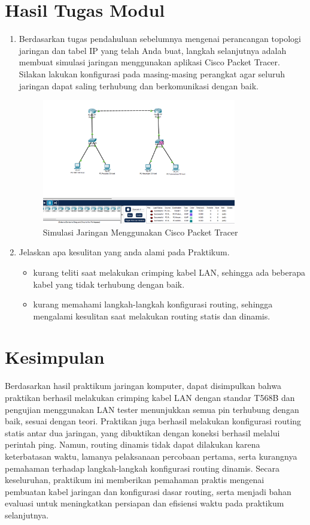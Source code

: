 \section{Hasil Tugas Modul}
\begin{enumerate}
    \item Berdasarkan tugas pendahuluan sebelumnya mengenai perancangan topologi jaringan dan tabel IP yang telah Anda buat, langkah selanjutnya adalah membuat simulasi jaringan menggunakan aplikasi Cisco Packet Tracer. Silakan lakukan konfigurasi pada masing-masing perangkat agar seluruh jaringan dapat saling terhubung dan berkomunikasi dengan baik.
    \begin{figure}
        \centering
        \includegraphics[width=0.8\textwidth]{P1/img/image.png}
        \caption{Simulasi Jaringan Menggunakan Cisco Packet Tracer}
        \label{fig:simulasi_jaringan}
    \end{figure}

    \item Jelaskan apa kesulitan yang anda alami pada Praktikum.
    \begin{itemize}
        \item kurang teliti saat melakukan crimping kabel LAN, sehingga ada beberapa kabel yang tidak terhubung dengan baik.
        \item kurang memahami langkah-langkah konfigurasi routing, sehingga mengalami kesulitan saat melakukan routing statis dan dinamis.
    \end{itemize}
\end{enumerate}


\section{Kesimpulan}
Berdasarkan hasil praktikum jaringan komputer, dapat disimpulkan bahwa praktikan berhasil melakukan crimping kabel LAN dengan standar T568B dan pengujian menggunakan LAN tester menunjukkan semua pin terhubung dengan baik, sesuai dengan teori. Praktikan juga berhasil melakukan konfigurasi routing statis antar dua jaringan, yang dibuktikan dengan koneksi berhasil melalui perintah ping. Namun, routing dinamis tidak dapat dilakukan karena keterbatasan waktu, lamanya pelaksanaan percobaan pertama, serta kurangnya pemahaman terhadap langkah-langkah konfigurasi routing dinamis. Secara keseluruhan, praktikum ini memberikan pemahaman praktis mengenai pembuatan kabel jaringan dan konfigurasi dasar routing, serta menjadi bahan evaluasi untuk meningkatkan persiapan dan efisiensi waktu pada praktikum selanjutnya.

